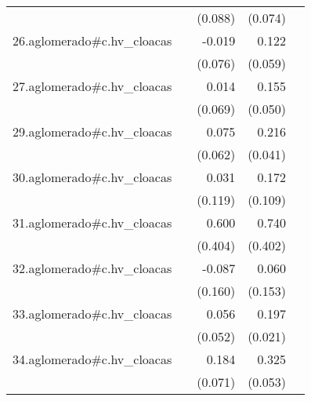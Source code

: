 {\begin{longtable}{l*{4}{D{.}{.}{-1}}}
            &                     &     (0.088)         &     (0.074)         &                     \\
\addlinespace
26.aglomerado#c.hv\_cloacas&                     &      -0.019         &       0.122\sym{*}  &                     \\
            &                     &     (0.076)         &     (0.059)         &                     \\
\addlinespace
27.aglomerado#c.hv\_cloacas&                     &       0.014         &       0.155\sym{**} &                     \\
            &                     &     (0.069)         &     (0.050)         &                     \\
\addlinespace
29.aglomerado#c.hv\_cloacas&                     &       0.075         &       0.216\sym{***}&                     \\
            &                     &     (0.062)         &     (0.041)         &                     \\
\addlinespace
30.aglomerado#c.hv\_cloacas&                     &       0.031         &       0.172         &                     \\
            &                     &     (0.119)         &     (0.109)         &                     \\
\addlinespace
31.aglomerado#c.hv\_cloacas&                     &       0.600         &       0.740         &                     \\
            &                     &     (0.404)         &     (0.402)         &                     \\
\addlinespace
32.aglomerado#c.hv\_cloacas&                     &      -0.087         &       0.060         &                     \\
            &                     &     (0.160)         &     (0.153)         &                     \\
\addlinespace
33.aglomerado#c.hv\_cloacas&                     &       0.056         &       0.197\sym{***}&                     \\
            &                     &     (0.052)         &     (0.021)         &                     \\
\addlinespace
34.aglomerado#c.hv\_cloacas&                     &       0.184\sym{**} &       0.325\sym{***}&                     \\
            &                     &     (0.071)         &     (0.053)         &                     \\

\end{longtable}}
